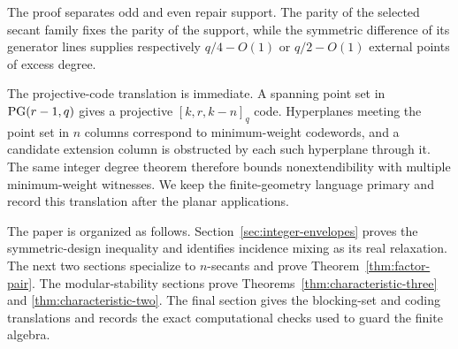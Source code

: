 The proof separates odd and even repair support.  The parity of the selected
secant family fixes the parity of the support, while the symmetric difference
of its generator lines supplies respectively \(q/4-O(1)\) or \(q/2-O(1)\)
external points of excess degree.

The projective-code translation is immediate.  A spanning point set in
\(\mathrm{PG}(r-1,q)\) gives a projective \([k,r,k-n]_q\) code.  Hyperplanes meeting
the point set in \(n\) columns correspond to minimum-weight codewords, and a
candidate extension column is obstructed by each such hyperplane through it.
The same integer degree theorem
therefore bounds nonextendibility with multiple minimum-weight witnesses.
We keep the finite-geometry language primary and record this translation
after the planar applications.

The paper is organized as follows.  Section~\ref{sec:integer-envelopes}
proves the symmetric-design inequality and identifies incidence mixing as its
real relaxation.  The next two sections specialize to \(n\)-secants and
prove Theorem~\ref{thm:factor-pair}.  The modular-stability sections prove
Theorems~\ref{thm:characteristic-three} and
\ref{thm:characteristic-two}.  The final section gives the blocking-set and
coding translations and records the exact computational checks used to guard
the finite algebra.
